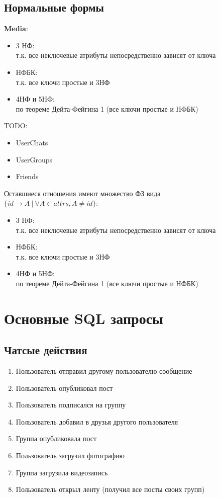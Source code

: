 \documentclass[12pt, a4paper] {ncc}
\begin{document}
\subsection{Нормальные формы}
\textbf{Media}:
\begin{itemize}
\item 3 НФ: \\
т.к. все неключевые атрибуты непосредственно зависят от ключа
\item НФБК: \\
т.к. все ключи простые и 3НФ
\item 4НФ и 5НФ: \\
по теореме Дейта-Фейгина 1 (все ключи простые и НФБК)
\end{itemize}
TODO:
\begin{itemize}
\item UserChats
\item UserGroups
\item Friends
\end{itemize}
Оставшиеся отношения имеют множество ФЗ вида \\
$\{id \rightarrow A ~ | ~ \forall A \in \textit{attrs}, A \ne id\}$:
\begin{itemize}
\item 3 НФ: \\
т.к. все неключевые атрибуты непосредственно зависят от ключа
\item НФБК: \\
т.к. все ключи простые и 3НФ
\item 4НФ и 5НФ: \\
по теореме Дейта-Фейгина 1 (все ключи простые и НФБК)
\end{itemize}
\section{Основные SQL запросы}
\subsection{Чатсые действия}
\begin{enumerate}
\item Пользователь отправил другому пользователю сообщение
\item Пользователь опубликовал пост
\item Пользователь подписался на группу
\item Пользователь добавил в друзья другого пользователя
\item Группа опубликовала пост
\item Пользователь загрузил фотографию
\item Группа загрузила видеозапись
\item Пользователь открыл ленту (получил все посты своих групп)
\end{enumerate}
\end{document}
